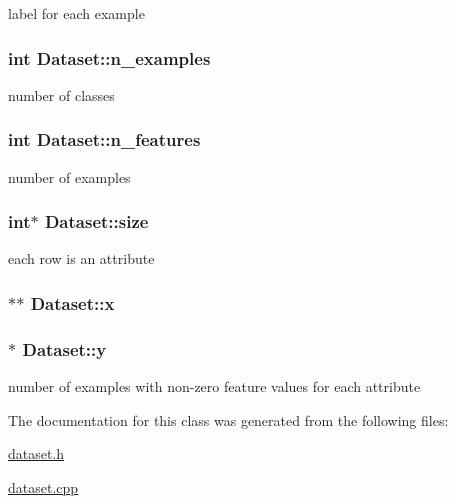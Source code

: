label for each example \hypertarget{class_dataset_af8ed6e43e9612787cb154dcfea846914}{
\subsubsection[{n\+\_\+examples}]{\setlength{\rightskip}{0pt plus 5cm}int Dataset\+::n\+\_\+examples\hspace{0.3cm}{\ttfamily [private]}}}\label{class_dataset_af8ed6e43e9612787cb154dcfea846914}
number of classes \hypertarget{class_dataset_acc4ccee0cbdb6866a0063e11f0fcc591}{
\subsubsection[{n\+\_\+features}]{\setlength{\rightskip}{0pt plus 5cm}int Dataset\+::n\+\_\+features\hspace{0.3cm}{\ttfamily [private]}}}\label{class_dataset_acc4ccee0cbdb6866a0063e11f0fcc591}
number of examples \hypertarget{class_dataset_aba2801612de4973f959c4ac2aa710280}{
\subsubsection[{size}]{\setlength{\rightskip}{0pt plus 5cm}int$\ast$ Dataset\+::size\hspace{0.3cm}{\ttfamily [private]}}}\label{class_dataset_aba2801612de4973f959c4ac2aa710280}
each row is an attribute \hypertarget{class_dataset_ab9b5b82dc20c825d376fe3d6a9493c11}{
\subsubsection[{x}]{$\ast$$\ast$ Dataset\+::x\hspace{0.3cm}{\ttfamily [private]}}}\label{class_dataset_ab9b5b82dc20c825d376fe3d6a9493c11}
\hypertarget{class_dataset_a6aec5fa400b9ad6d9a65cc782f7f1686}{
\subsubsection[{y}]{$\ast$ Dataset\+::y\hspace{0.3cm}{\ttfamily [private]}}}\label{class_dataset_a6aec5fa400b9ad6d9a65cc782f7f1686}
number of examples with non-\/zero feature values for each attribute 

The documentation for this class was generated from the following files\+:\begin{DoxyCompactItemize}
\item 
\hyperlink{dataset_8h}{dataset.\+h}\item 
\hyperlink{dataset_8cpp}{dataset.\+cpp}\end{DoxyCompactItemize}
